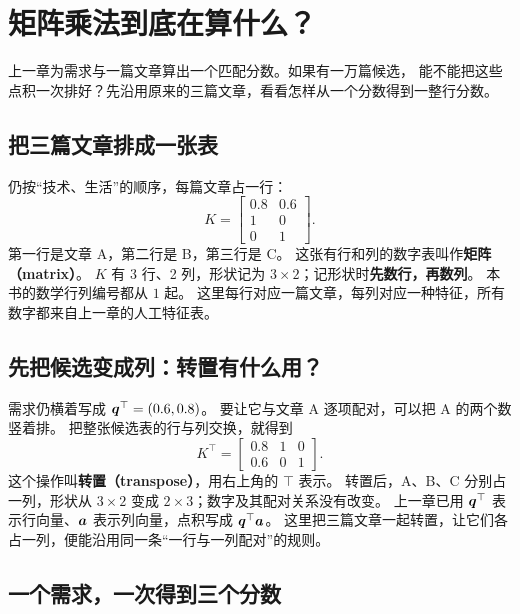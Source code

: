 \chapterrule
\section{矩阵乘法到底在算什么？}
\label{intro:matrix-multiplication}

上一章为需求与一篇文章算出一个匹配分数。如果有一万篇候选，
能不能把这些点积一次排好？先沿用原来的三篇文章，看看怎样从一个分数得到一整行分数。

\subsection{把三篇文章排成一张表}
\label{concept:matrix}

仍按“技术、生活”的顺序，每篇文章占一行：
\[
K=\begin{bmatrix}0.8&0.6\\1&0\\0&1\end{bmatrix}.
\]
第一行是文章 A，第二行是 B，第三行是 C。
这张有行和列的数字表叫作\textbf{矩阵（matrix）}。
$K$ 有 3 行、2 列，形状记为 $3\times2$；记形状时\textbf{先数行，再数列}。
本书的数学行列编号都从 $1$ 起。
这里每行对应一篇文章，每列对应一种特征，所有数字都来自上一章的人工特征表。

\subsection{先把候选变成列：转置有什么用？}
\label{sec:layout-matrix-card}
\label{concept:transpose}

需求仍横着写成 $\boldsymbol{q}^\top=(0.6,0.8)$。
要让它与文章 A 逐项配对，可以把 A 的两个数竖着排。
把整张候选表的行与列交换，就得到
\[
K^\top=\begin{bmatrix}0.8&1&0\\0.6&0&1\end{bmatrix}.
\]
这个操作叫\textbf{转置（transpose）}，用右上角的 $\top$ 表示。
转置后，A、B、C 分别占一列，形状从 $3\times2$ 变成 $2\times3$；数字及其配对关系没有改变。
上一章已用 $\boldsymbol{q}^\top$ 表示行向量、$\boldsymbol{a}$ 表示列向量，点积写成 $\boldsymbol{q}^\top\boldsymbol{a}$。
这里把三篇文章一起转置，让它们各占一列，便能沿用同一条“一行与一列配对”的规则。



\subsection{一个需求，一次得到三个分数}

